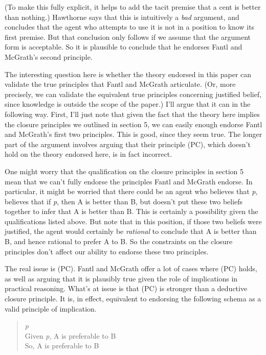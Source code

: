 \documentclass[
  11pt,
  letterpaper,
  DIV=11,
  numbers=noendperiod,
  oneside]{scrartcl}
\begin{document}
(To make this fully explicit, it helps to add the tacit premise that a
cent is better than nothing.) Hawthorne says that this is intuitively a
\emph{bad} argument, and concludes that the agent who attempts to use it
is not in a position to know its first premise. But that conclusion only
follows if we assume that the argument form is acceptable. So it is
plausible to conclude that he endorses Fantl and McGrath's second
principle.

The interesting question here is whether the theory endorsed in this
paper can validate the true principles that Fantl and McGrath
articulate. (Or, more precisely, we can validate the equivalent true
principles concerning justified belief, since knowledge is outside the
scope of the paper.) I'll argue that it can in the following way. First,
I'll just note that given the fact that the theory here implies the
closure principles we outlined in section 5, we can easily enough
endorse Fantl and McGrath's first two principles. This is good, since
they seem true. The longer part of the argument involves arguing that
their principle (PC), which doesn't hold on the theory endorsed here, is
in fact incorrect.

One might worry that the qualification on the closure principles in
section 5 mean that we can't fully endorse the principles Fantl and
McGrath endorse. In particular, it might be worried that there could be
an agent who believes that \emph{p}, believes that if \emph{p}, then A
is better than B, but doesn't put these two beliefs together to infer
that A is better than B. This is certainly a possibility given the
qualifications listed above. But note that in this position, if those
two beliefs were justified, the agent would certainly be \emph{rational}
to conclude that A is better than B, and hence rational to prefer A to
B. So the constraints on the closure principles don't affect our ability
to endorse these two principles.

The real issue is (PC). Fantl and McGrath offer a lot of cases where
(PC) holds, as well as arguing that it is plausibly true given the role
of implications in practical reasoning. What's at issue is that (PC) is
stronger than a deductive closure principle. It is, in effect,
equivalent to endorsing the following schema as a valid principle of
implication.

\begin{quote}
\emph{p}\\
Given \emph{p}, A is preferable to B\\
So, A is preferable to B
\end{quote}
\end{document}
